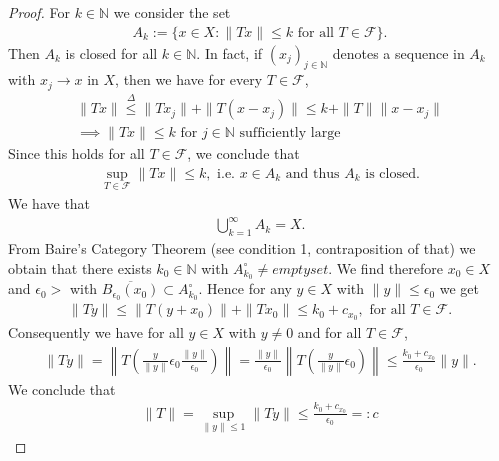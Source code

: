\documentclass[11pt,a4paper]{article}
\theoremstyle{definition}
\begin{document}
\begin{proof}
For $k \in \mathbb{N}$ we consider the set 
\begin{align*}
A_k := \lbrace x \in X : \| Tx \| \leq k \text{ for all } T \in \mathcal{F} \rbrace.
\end{align*}
Then $A_k$ is closed for all $k \in \mathbb{N}$. In fact, if $(x_j)_{j \in \mathbb{N}}$ denotes a sequence in $A_k$ with $x_j \to x$ in $X$, then we have for every $T \in \mathcal{F}$,
\begin{align*}
\|Tx\| \overset{\Delta} \leq \| Tx_j\| + \|T(x-x_j)\| \leq k + \|T\| \|x-x_j\|   \\
\implies \|Tx\| \leq k \text{ for $j \in \mathbb{N}$ sufficiently large}
\end{align*}
Since this holds for all $T \in \mathcal{F}$, we conclude that 
\begin{align*}
\sup_{T \in \mathcal{F}} \|Tx \| \leq k, \text{ i.e. } x \in A_k \text{ and thus } A_k \text{ is closed}. 
\end{align*}
We have that 
\begin{align*}
\bigcup_{k=1}^\infty A_k = X.
\end{align*}
From Baire's Category Theorem (see condition 1, contraposition of that) we obtain that there exists $k_0 \in \mathbb{N}$ with $A_{k_0}^\circ \neq emptyset$.
\newpage We find therefore $x_0 \in X$ and $\epsilon_0 >$ with $\overline{B_{ \epsilon_0}(x_0)} \subset A_{k_0}^\circ$. Hence for any $y \in X$ with $\| y \| \leq \epsilon_0$ we get 
\begin{align*}
\|Ty\| \leq \| T(y+x_0)\| + \|Tx_0\| \leq k_0 + c_{x_0}, \text{ for all } T \in \mathcal{F}.
\end{align*}
Consequently we have for all $y \in X$ with $y \neq 0$ and for all $T \in \mathcal{F}$,
\begin{align*}
\|Ty \| = \left\| T \left( \frac{y}{\|y\|} \epsilon_0 \frac{\|y \|}{\epsilon_0} \right) \right\| = \frac{\|y\|}{\epsilon_0} \left\| T \left( \frac{y}{\|y\|} 	\epsilon_0 \right) \right\| \leq \frac{k_0 + c_{x_0}}{\epsilon_0} \|y\|.
\end{align*}
We conclude that
\begin{align*}
\|T\| = \sup_{\|y\| \leq 1} \|Ty\| \leq \frac{k_0+c_{x_0}}{\epsilon_0}=:c
\end{align*}
\end{proof}
\end{document}
